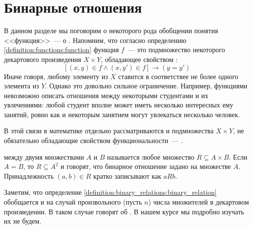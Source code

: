 \section{Бинарные отношения}
\label{sec:binary_relations}

В данном разделе мы поговорим о некоторого рода обобщении понятия <<функция>>~--- о .
Напомним, что согласно определению \ref{definition:functions:function} функция $ f $~---
это подмножество некоторого декартового произведения $ X \times Y $,
обладающее свойством :
\[
    \left[ (x, y) \in f \wedge (x, y') \in f \right] \rightarrow (y = y')
\]
Иначе говоря, любому элементу из $ X $ ставится в соответствее не более одного элемента из $ Y $.
Однако это довольно сильное ограничение.
Например, функциями невозможно описать отношения между некоторыми студентами и их увлечениями:
любой студент вполне может иметь несколько интересных ему занятий,
ровно как и некоторым занятием могут увлекаться несколько человек.

В этой связи в математике отдельно рассматриваются и подмножества $ X \times Y $,
не обязательно обладающие свойством функциональности~--- .

\begin{definition}
    \label{definition:binary_relations:binary_relation}
     между двумя множествами $ A $ и $ B $ называется любое множество $ R \subseteq A \times B $.
    Если $ A = B $, то $ R \subseteq A^2 $ и говорят, что бинарное отношение задано на множестве $ A $.
    Принадлежность $ (a, b) \in R $ кратко записывают как $ a R b $.
\end{definition}

\begin{remark}
    Заметим, что определение \ref{definition:binary_relations:binary_relation} обобщается и на случай произвольного (пусть $ n $) числа множителей в декартовом произведении.
    В таком случае говорят об .
    В нашем курсе мы подробно изучать их не будем.
\end{remark}

